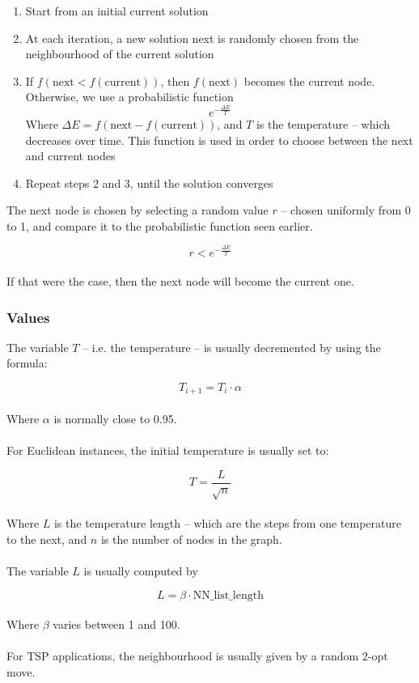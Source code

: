 \documentclass{article}
\begin{document}
\begin{enumerate}
	\item Start from an initial current solution
	\item At each iteration, a new solution next is randomly chosen from the neighbourhood of the current solution
	\item If $f(\text{next} < f(\text{current}))$, then $f(\text{next})$ becomes the current node. Otherwise, we use a probabilistic function
	\[ e^{-\frac{\Delta E}{T}} \]
	Where $\Delta E = f(\text{next} - f(\text{current}))$, and $T$ is the temperature -- which decreases over time. This function is used in order to choose between the next and current nodes
	\item Repeat steps 2 and 3, until the solution converges
\end{enumerate}
The next node is chosen by selecting a random value $r$ -- chosen uniformly from 0 to 1, and compare it to the probabilistic function seen earlier.

\[ r < e^{-\frac{\Delta E}{T}} \] \\
If that were the case, then the next node will become the current one.

\subsubsection{Values}
The variable $T$ -- i.e. the temperature -- is usually decremented by using the formula:

\[ T_{i + 1} = T_i \cdot \alpha \] \\
Where $\alpha$ is normally close to 0.95. \\ \\
For Euclidean instances, the initial temperature is usually set to:

\[ T = \frac{L}{\sqrt{n}} \] \\
Where $L$ is the temperature length -- which are the steps from one temperature to the next, and $n$ is the number of nodes in the graph. \\ \\
The variable $L$ is usually computed by

\[ L = \beta \cdot \text{NN\_list\_length} \] \\
Where $\beta$ varies between 1 and 100. \\ \\
For TSP applications, the neighbourhood is usually given by a random 2-opt move.
\end{document}
